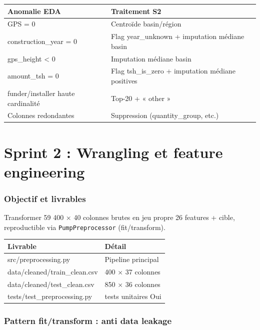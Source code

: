 \documentclass[11pt,a4paper]{report}
\begin{document}
{\small
\begin{longtable}{@{}>{\raggedright\arraybackslash}p{}>{\raggedright\arraybackslash}p{}@{}}
\toprule
\rowcolor{EHTPTableHead}Anomalie EDA & Traitement S2 \\
\midrule
GPS = 0 & Centroïde basin/région \\
construction\_year = 0 & Flag year\_unknown + imputation médiane basin \\
gps\_height < 0 & Imputation médiane basin \\
amount\_tsh = 0 & Flag tsh\_is\_zero + imputation médiane positives \\
funder/installer haute cardinalité & Top-20 + « other » \\
Colonnes redondantes & Suppression (quantity\_group, etc.) \\
\bottomrule
\end{longtable}
}

\clearpage

\chapter[Sprint 2]{Sprint 2 : Wrangling et feature engineering}

\label{ch:sprint2}

\subsection{Objectif et livrables}

Transformer 59 400 × 40 colonnes brutes en jeu propre 26 features + cible, reproductible via \texttt{PumpPreprocessor} (fit/transform).

{\small
\begin{longtable}{@{}>{\raggedright\arraybackslash}p{}>{\raggedright\arraybackslash}p{}@{}}
\toprule
\rowcolor{EHTPTableHead}Livrable & Détail \\
\midrule
src/preprocessing.py & Pipeline principal \\
data/cleaned/train\_clean.csv & 59 400 × 37 colonnes \\
data/cleaned/test\_clean.csv & 14 850 × 36 colonnes \\
tests/test\_preprocessing.py & 13 tests unitaires Oui \\
\bottomrule
\end{longtable}
}

\subsection{Pattern fit/transform : anti data leakage}
\end{document}
